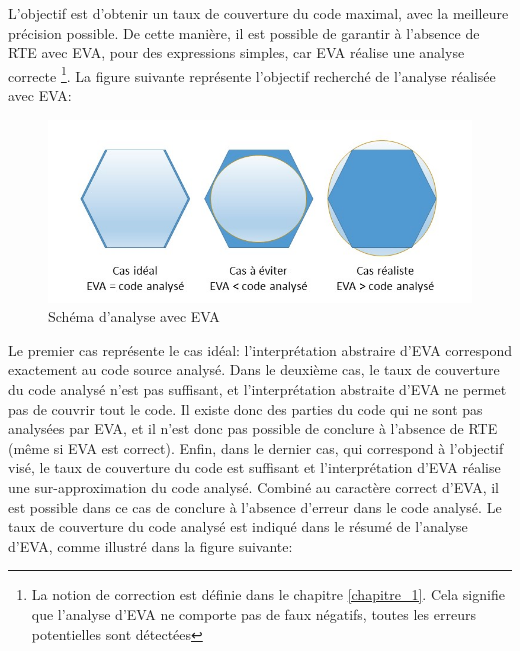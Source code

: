 \noindent L'objectif est d'obtenir un taux de couverture du code maximal, avec la meilleure précision possible. De cette manière, il est possible de garantir à l'absence de RTE avec EVA, pour des expressions simples, car EVA réalise une analyse correcte \footnote{La notion de correction est définie dans le chapitre \ref{chapitre_1}. Cela signifie que l'analyse d'EVA ne comporte pas de faux négatifs, toutes les erreurs potentielles sont détectées }. La figure suivante représente l'objectif recherché de l'analyse réalisée avec EVA:

\begin{figure}[!h]
\centering
\includegraphics[width=16cm]{images/schema_analyse_eva.png}
\caption{Schéma d'analyse avec EVA}
\label{Schéma d'analyse avec EVA}
\end{figure}

\noindent Le premier cas représente le cas idéal: l'interprétation abstraire d'EVA correspond exactement au code source analysé.
\newline \noindent Dans le deuxième cas, le taux de couverture du code analysé n'est pas suffisant, et l'interprétation abstraite d'EVA ne permet pas de couvrir tout le code. Il existe donc des parties du code qui ne sont pas analysées par EVA, et il n'est donc pas possible de conclure à l'absence de RTE (même si EVA est correct).
\newline \noindent Enfin, dans le dernier cas, qui correspond à l'objectif visé, le taux de couverture du code est suffisant et l'interprétation d'EVA réalise une sur-approximation du code analysé. Combiné au caractère correct d'EVA, il est possible dans ce cas de conclure à l'absence d'erreur dans le code analysé.
\newline
\newline \noindent Le taux de couverture du code analysé est indiqué dans le résumé de l'analyse d'EVA, comme illustré dans la figure suivante:

